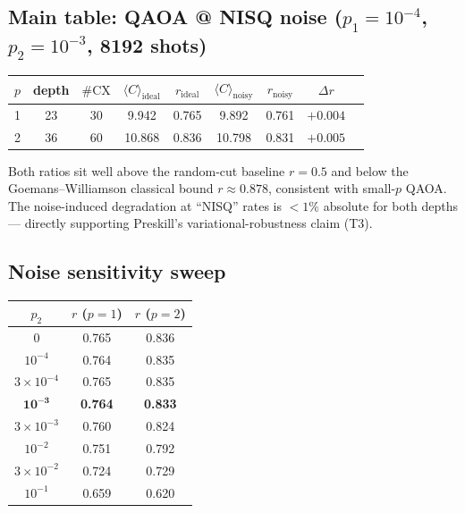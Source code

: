 \documentclass[11pt]{article}
\begin{document}
\subsection{Main table: QAOA @ NISQ noise ($p_1{=}10^{-4}$, $p_2{=}10^{-3}$, 8192 shots)}

\begin{center}
\begin{tabular}{ccccccccc}
\toprule
$p$ & depth & $\#\text{CX}$ & $\langle C\rangle_{\text{ideal}}$ & $r_{\text{ideal}}$ & $\langle C\rangle_{\text{noisy}}$ & $r_{\text{noisy}}$ & $\Delta r$ \\
\midrule
1 & 23 & 30 & 9.942  & 0.765 & 9.892  & 0.761 & $+0.004$ \\
2 & 36 & 60 & 10.868 & 0.836 & 10.798 & 0.831 & $+0.005$ \\
\bottomrule
\end{tabular}
\end{center}

Both ratios sit well above the random-cut baseline $r{=}0.5$ and below the
Goemans--Williamson classical bound $r \approx 0.878$, consistent with small-$p$
QAOA. The noise-induced degradation at ``NISQ'' rates is $<1\%$ absolute for
both depths --- directly supporting Preskill's variational-robustness claim (T3).

\subsection{Noise sensitivity sweep}

\begin{center}
\begin{tabular}{ccc}
\toprule
$p_2$ & $r$ ($p{=}1$) & $r$ ($p{=}2$) \\
\midrule
$0$        & 0.765 & 0.836 \\
$10^{-4}$  & 0.764 & 0.835 \\
$3{\times}10^{-4}$ & 0.765 & 0.835 \\
$\mathbf{10^{-3}}$ & \textbf{0.764} & \textbf{0.833} \\
$3{\times}10^{-3}$ & 0.760 & 0.824 \\
$10^{-2}$  & 0.751 & 0.792 \\
$3{\times}10^{-2}$ & 0.724 & 0.729 \\
$10^{-1}$  & 0.659 & 0.620 \\
\bottomrule
\end{tabular}
\end{center}
\end{document}
